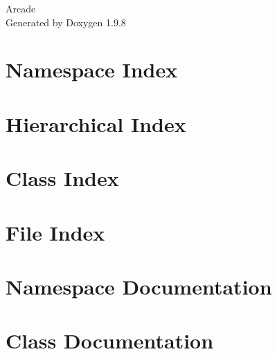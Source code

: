 \documentclass[twoside]{book}
\newcommand{\+}{\discretionary{\mbox{\scriptsize$\hookleftarrow$}}{}{}}
\newcommand{\clearemptydoublepage}{%
    \newpage{\pagestyle{empty}\cleardoublepage}%
  }
\begin{document}
  \raggedbottom
    \hypersetup{pageanchor=false,
                bookmarksnumbered=true,
                pdfencoding=unicode
               }
  \begin{titlepage}
  \vspace*{7cm}
  \begin{center}%
  {\Large Arcade}\\
  \vspace*{1cm}
  {\large Generated by Doxygen 1.9.8}\\
  \end{center}
  \end{titlepage}
  \clearemptydoublepage
  \tableofcontents
  \clearemptydoublepage
  \hypersetup{pageanchor=true}
\chapter{Namespace Index}

\chapter{Hierarchical Index}

\chapter{Class Index}

\chapter{File Index}

\chapter{Namespace Documentation}


\chapter{Class Documentation}




























\end{document}

